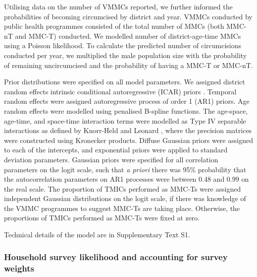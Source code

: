 \documentclass{article}
\begin{document}
Utilising data on the number of VMMCs reported, we further informed the probabilities of becoming circumcised by district and year. VMMCs conducted by public health programmes consisted of the total number of MMCs (both MMC-nT and MMC-T) conducted. We modelled number of district-age-time MMCs using a Poisson likelihood. To calculate the predicted number of circumcisions conducted per year, we multiplied the male population size with the probability of remaining uncircumcised and the probability of having a MMC-T or MMC-nT. 

Prior distributions were specified on all model parameters. We assigned district random effects intrinsic conditional autoregressive (ICAR) priors \cite{besag1995conditional}. Temporal random effects were assigned autoregressive process of order 1 (AR1) priors. Age random effects were modelled using penalised B-spline functions. The age-space, age-time, and space-time interaction terms were modelled as Type IV separable interactions as defined by Knorr-Held and Leonard \cite{knorr2000bayesian}, where the precision matrices were constructed using Kronecker products. Diffuse Gaussian priors were assigned to each of the intercepts, and exponential priors were applied to standard deviation parameters. Gaussian priors were specified for all correlation parameters on the logit scale, such that \textit{a priori} there was 95\% probability that the autocorrelation parameters on AR1 processes were between 0.48 and 0.99 on the real scale. The proportion of TMICs performed as MMC-Ts were assigned independent Gaussian distributions on the logit scale, if there was knowledge of the VMMC programmes to suggest MMC-Ts are taking place. Otherwise, the proportions of TMICs performed as MMC-Ts were fixed at zero. 

Technical details of the model are in Supplementary Text S1.


\subsubsection*{Household survey likelihood and accounting for survey weights}

\end{document}
